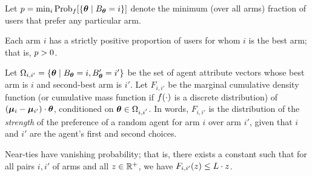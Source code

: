 Let $\MinProb = \min_{i} \Prob[\AgentDist]{\Set{\AgV}{\Best{\AgV} = i}}$
denote the minimum (over all arms) fraction of users that prefer any
particular arm.

\begin{assumption} \label{A3}
Each arm $i$ has a strictly positive proportion of users for whom $i$
is the best arm; that is, $p > 0$.
\end{assumption}

Let $\Omega_{i,i'} = \{ \bm{\theta} \mid B_{\bm{\theta}} = i, B'_{\bm{\theta}} = i' \}$
be the set of agent attribute vectors whose best arm is $i$ and
second-best arm is $i'$.
Let $F_{i,i'}$ be the marginal cumulative density function
(or cumulative mass function if $f(\cdot)$ is a discrete distribution)
of $(\bm{\mu}_{i}-\bm{\mu}_{i'}) \cdot \bm{\theta}$,
conditioned on $\bm{\theta} \in \Omega_{i,i^{'}}$.
In words, $F_{i,i'}$ is the distribution of the \emph{strength} of the
preference of a random agent for arm $i$ over arm $i'$, given that
$i$ and $i'$ are the agent's first and second choices.

\begin{assumption} \label{A1}
Near-ties have vanishing probability; 
that is, there exists a constant \TieDensity such that
for all pairs $i,i'$ of arms and all $z \in \mathbb{R}^+$,
we have $F_{i,i'}(z) \leq L \cdot z$.
\end{assumption}






